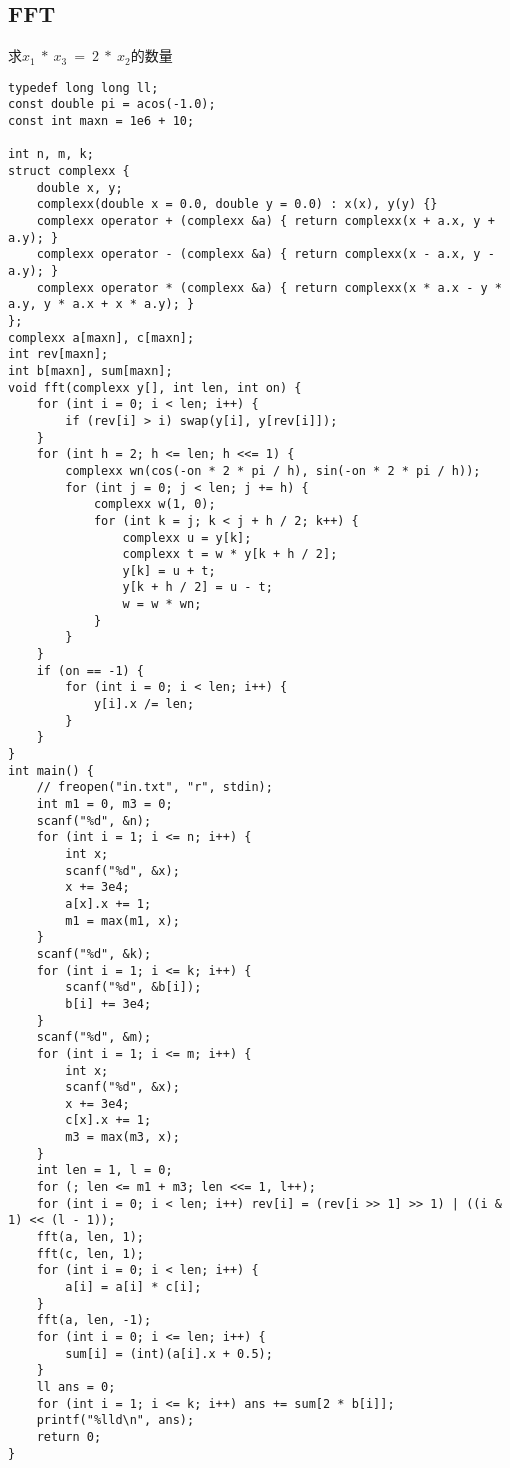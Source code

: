 \subsection{FFT}
求$x_1\ *\ x_3\ =\ 2\ *\ x_2$的数量
\begin{lstlisting}
typedef long long ll;
const double pi = acos(-1.0);
const int maxn = 1e6 + 10;

int n, m, k;
struct complexx {
	double x, y;
	complexx(double x = 0.0, double y = 0.0) : x(x), y(y) {}
	complexx operator + (complexx &a) { return complexx(x + a.x, y + a.y); }
	complexx operator - (complexx &a) { return complexx(x - a.x, y - a.y); }
	complexx operator * (complexx &a) { return complexx(x * a.x - y * a.y, y * a.x + x * a.y); }
};
complexx a[maxn], c[maxn];
int rev[maxn];
int b[maxn], sum[maxn];
void fft(complexx y[], int len, int on) {
	for (int i = 0; i < len; i++) {
		if (rev[i] > i) swap(y[i], y[rev[i]]);
	}
	for (int h = 2; h <= len; h <<= 1) {
		complexx wn(cos(-on * 2 * pi / h), sin(-on * 2 * pi / h));
		for (int j = 0; j < len; j += h) {
			complexx w(1, 0);
			for (int k = j; k < j + h / 2; k++) {
				complexx u = y[k];
				complexx t = w * y[k + h / 2];
				y[k] = u + t;
				y[k + h / 2] = u - t;
				w = w * wn;
			}
		}
	}
	if (on == -1) {
		for (int i = 0; i < len; i++) {
			y[i].x /= len;
		}
	}
}
int main() {
	// freopen("in.txt", "r", stdin);
	int m1 = 0, m3 = 0;
	scanf("%d", &n);
	for (int i = 1; i <= n; i++) {
		int x;
		scanf("%d", &x);
		x += 3e4;
		a[x].x += 1;
		m1 = max(m1, x);
	}
	scanf("%d", &k);
	for (int i = 1; i <= k; i++) {
		scanf("%d", &b[i]);
		b[i] += 3e4;
	}
	scanf("%d", &m);
	for (int i = 1; i <= m; i++) {
		int x;
		scanf("%d", &x);
		x += 3e4;
		c[x].x += 1;
		m3 = max(m3, x);
	}
	int len = 1, l = 0;
	for (; len <= m1 + m3; len <<= 1, l++);
	for (int i = 0; i < len; i++) rev[i] = (rev[i >> 1] >> 1) | ((i & 1) << (l - 1));
	fft(a, len, 1);
	fft(c, len, 1);
	for (int i = 0; i < len; i++) {
		a[i] = a[i] * c[i];
	}
	fft(a, len, -1);
	for (int i = 0; i <= len; i++) {
		sum[i] = (int)(a[i].x + 0.5);
	}
	ll ans = 0;
	for (int i = 1; i <= k; i++) ans += sum[2 * b[i]];
	printf("%lld\n", ans);
	return 0;
}
\end{lstlisting}

